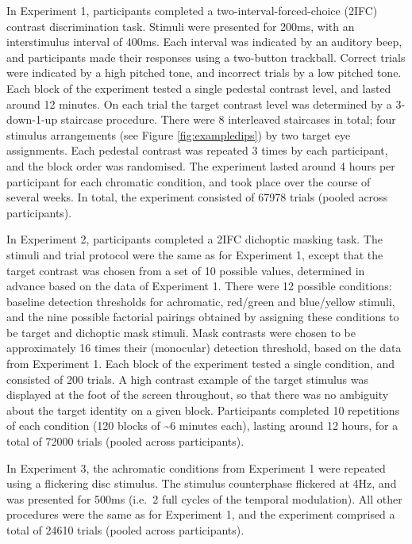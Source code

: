 \documentclass[
]{article}
\begin{document}
In Experiment 1, participants completed a two-interval-forced-choice (2IFC) contrast discrimination task. Stimuli were presented for 200ms, with an interstimulus interval of 400ms. Each interval was indicated by an auditory beep, and participants made their responses using a two-button trackball. Correct trials were indicated by a high pitched tone, and incorrect trials by a low pitched tone. Each block of the experiment tested a single pedestal contrast level, and lasted around 12 minutes. On each trial the target contrast level was determined by a 3-down-1-up staircase procedure. There were 8 interleaved staircases in total; four stimulus arrangements (see Figure \ref{fig:exampledips}) by two target eye assignments. Each pedestal contrast was repeated 3 times by each participant, and the block order was randomised. The experiment lasted around 4 hours per participant for each chromatic condition, and took place over the course of several weeks. In total, the experiment consisted of 67978 trials (pooled across participants).

In Experiment 2, participants completed a 2IFC dichoptic masking task. The stimuli and trial protocol were the same as for Experiment 1, except that the target contrast was chosen from a set of 10 possible values, determined in advance based on the data of Experiment 1. There were 12 possible conditions: baseline detection thresholds for achromatic, red/green and blue/yellow stimuli, and the nine possible factorial pairings obtained by assigning these conditions to be target and dichoptic mask stimuli. Mask contrasts were chosen to be approximately 16 times their (monocular) detection threshold, based on the data from Experiment 1. Each block of the experiment tested a single condition, and consisted of 200 trials. A high contrast example of the target stimulus was displayed at the foot of the screen throughout, so that there was no ambiguity about the target identity on a given block. Participants completed 10 repetitions of each condition (120 blocks of \textasciitilde6 minutes each), lasting around 12 hours, for a total of 72000 trials (pooled across participants).

In Experiment 3, the achromatic conditions from Experiment 1 were repeated using a flickering disc stimulus. The stimulus counterphase flickered at 4Hz, and was presented for 500ms (i.e.~2 full cycles of the temporal modulation). All other procedures were the same as for Experiment 1, and the experiment comprised a total of 24610 trials (pooled across participants).
\end{document}
